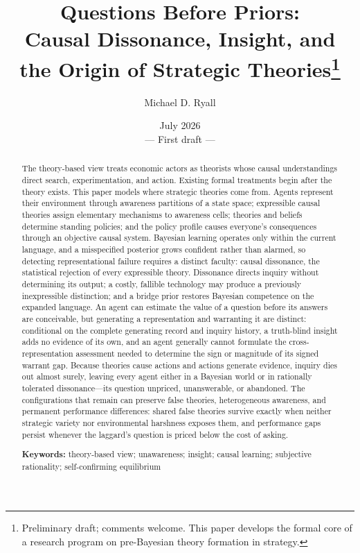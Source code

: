 \documentclass[11pt]{article}
\title{\textbf{Questions Before Priors:}\\
Causal Dissonance, Insight, and the Origin of Strategic Theories\thanks{%
Preliminary draft; comments welcome.  This paper develops the formal core of
a research program on pre-Bayesian theory formation in strategy.}}
\author{Michael D. Ryall}
\date{July 2026\\[0.4em]\normalsize --- First draft ---}
\theoremstyle{definition}
\begin{document}
\maketitle

\begin{abstract}
\noindent The theory-based view treats economic actors as theorists whose causal understandings direct search, experimentation, and action.
Existing formal treatments begin after the theory exists.
This paper models where strategic theories come from.
Agents represent their environment through awareness partitions of a state space; expressible causal theories assign elementary mechanisms to awareness cells; theories and beliefs determine standing policies; and the policy profile causes everyone's consequences through an objective causal system.
Bayesian learning operates only within the current language, and a misspecified posterior grows confident rather than alarmed, so detecting representational failure requires a distinct faculty: causal dissonance, the statistical rejection of every expressible theory.
Dissonance directs inquiry without determining its output; a costly, fallible technology may produce a previously inexpressible distinction; and a bridge prior restores Bayesian competence on the expanded language.
An agent can estimate the value of a question before its answers are conceivable, but generating a representation and warranting it are distinct: conditional on the complete generating record and inquiry history, a truth-blind insight adds no evidence of its own, and an agent generally cannot formulate the cross-representation assessment needed to determine the sign or magnitude of its signed warrant gap.
Because theories cause actions and actions generate evidence, inquiry dies out almost surely, leaving every agent either in a Bayesian world or in rationally tolerated dissonance---its question unpriced, unanswerable, or abandoned.
The configurations that remain can preserve false theories, heterogeneous awareness, and permanent performance differences: shared false theories survive exactly when neither strategic variety nor environmental harshness exposes them, and performance gaps persist whenever the laggard's question is priced below the cost of asking.
\medskip

\noindent\textbf{Keywords:} theory-based view; unawareness; insight; causal learning; subjective rationality; self-confirming equilibrium
\end{abstract}

\newpage
\end{document}
